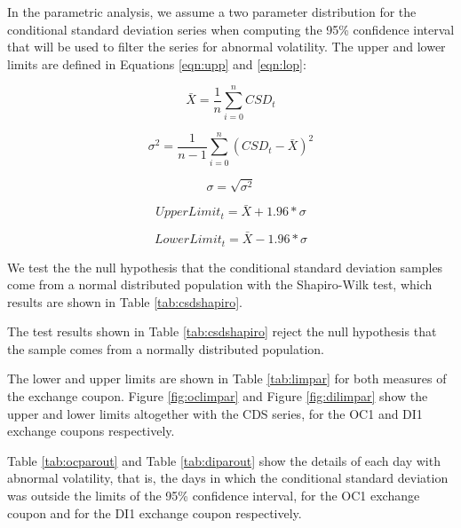 \documentclass[cic,tc, english]{iiufrgs}
\begin{document}
    In the parametric analysis, we assume a two parameter distribution for the conditional standard deviation series when computing the 95\% confidence interval that will be used to filter the series for abnormal volatility. The upper and lower limits are defined in Equations \ref{eqn:upp} and \ref{eqn:lop}: 

    $$\bar{X} = \frac{1}{n} \displaystyle\sum_{i=0}^{n} CSD_t$$

    $$\sigma^2 = \frac{1}{n-1} \displaystyle\sum_{i=0}^{n} (CSD_t - \bar{X})^2$$

    $$\sigma = \sqrt{\sigma^2}$$

    \begin{equation}
        \label{eqn:upp}
        UpperLimit_t = \bar{X} + 1.96 * \sigma
    \end{equation}

    \begin{equation}
        \label{eqn:lop}
        LowerLimit_t = \bar{X} - 1.96 * \sigma
    \end{equation}

    We test the the null hypothesis that the conditional standard deviation samples come from a normal distributed population with the Shapiro-Wilk test, which results are shown in Table \ref{tab:csdshapiro}.

    

    The test results shown in Table \ref{tab:csdshapiro} reject the null hypothesis that the sample comes from a normally distributed population.

    The lower and upper limits are shown in Table \ref{tab:limpar} for both measures of the exchange coupon. Figure \ref{fig:oclimpar} and Figure \ref{fig:dilimpar} show the upper and lower limits altogether with the CDS series, for the OC1 and DI1 exchange coupons respectively.

    

    

    

    Table \ref{tab:ocparout} and Table \ref{tab:diparout} show the details of each day with abnormal volatility, that is, the days in which the conditional standard deviation was outside the limits of the 95\% confidence interval, for the OC1 exchange coupon and for the DI1 exchange coupon respectively.

    
\end{document}
